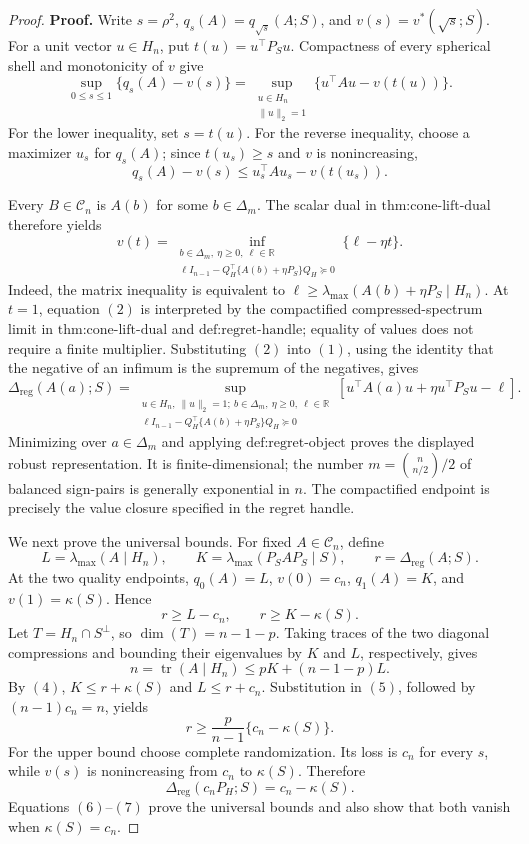 \documentclass{article}
\begin{document}
\begin{proof}
\textbf{Proof.}
Write \(s=\rho^2\), \(q_s(A)=q_{\sqrt{s}}(A;S)\), and \(v(s)=v^*(\sqrt{s};S)\).  For a unit vector \(u\in H_n\), put \(t(u)=u^\top P_Su\).  Compactness of every spherical shell and monotonicity of \(v\) give
\[
\sup_{0\leq s\leq1}\{q_s(A)-v(s)\}
=\sup_{\substack{u\in H_n\\\|u\|_2=1}}
\{u^\top Au-v(t(u))\}.
\tag{1}
\]
For the lower inequality, set \(s=t(u)\).  For the reverse inequality, choose a maximizer \(u_s\) for \(q_s(A)\); since \(t(u_s)\geq s\) and \(v\) is nonincreasing,
\[
q_s(A)-v(s)\leq u_s^\top Au_s-v(t(u_s)).
\]

Every \(B\in\mathcal C_n\) is \(A(b)\) for some \(b\in\Delta_m\).  The scalar dual in \(\text{thm:cone-lift-dual}\) therefore yields
\[
v(t)=
\inf_{\substack{b\in\Delta_m,\ \eta\geq0,\ \ell\in\mathbb R\\
\ell I_{n-1}-Q_H^\top\{A(b)+\eta P_S\}Q_H\succeq0}}
\{\ell-\eta t\}.
\tag{2}
\]
Indeed, the matrix inequality is equivalent to \(\ell\geq\lambda_{\max}(A(b)+\eta P_S\mid H_n)\).  At \(t=1\), equation \((2)\) is interpreted by the compactified compressed-spectrum limit in \(\text{thm:cone-lift-dual}\) and \(\text{def:regret-handle}\); equality of values does not require a finite multiplier.  Substituting \((2)\) into \((1)\), using the identity that the negative of an infimum is the supremum of the negatives, gives
\[
\Delta_{\mathrm{reg}}(A(a);S)
=\sup_{\substack{u\in H_n,\ \|u\|_2=1;\ b\in\Delta_m,\ \eta\geq0,\ \ell\in\mathbb R\\
\ell I_{n-1}-Q_H^\top\{A(b)+\eta P_S\}Q_H\succeq0}}
\left[u^\top A(a)u+\eta u^\top P_Su-\ell\right].
\tag{3}
\]
Minimizing over \(a\in\Delta_m\) and applying \(\text{def:regret-object}\) proves the displayed robust representation.  It is finite-dimensional; the number \(m=\binom{n}{n/2}/2\) of balanced sign-pairs is generally exponential in \(n\).  The compactified endpoint is precisely the value closure specified in the regret handle.

We next prove the universal bounds.  For fixed \(A\in\mathcal C_n\), define
\[
L=\lambda_{\max}(A\mid H_n),
\qquad
K=\lambda_{\max}(P_SAP_S\mid S),
\qquad
r=\Delta_{\mathrm{reg}}(A;S).
\]
At the two quality endpoints, \(q_0(A)=L\), \(v(0)=c_n\), \(q_1(A)=K\), and \(v(1)=\kappa(S)\).  Hence
\[
r\geq L-c_n,
\qquad
r\geq K-\kappa(S).
\tag{4}
\]
Let \(T=H_n\cap S^\perp\), so \(\dim(T)=n-1-p\).  Taking traces of the two diagonal compressions and bounding their eigenvalues by \(K\) and \(L\), respectively, gives
\[
n=\operatorname{tr}(A\mid H_n)
\leq pK+(n-1-p)L.
\tag{5}
\]
By \((4)\), \(K\leq r+\kappa(S)\) and \(L\leq r+c_n\).  Substitution in \((5)\), followed by \((n-1)c_n=n\), yields
\[
r\geq\frac{p}{n-1}\{c_n-\kappa(S)\}.
\tag{6}
\]
For the upper bound choose complete randomization.  Its loss is \(c_n\) for every \(s\), while \(v(s)\) is nonincreasing from \(c_n\) to \(\kappa(S)\).  Therefore
\[
\Delta_{\mathrm{reg}}(c_nP_H;S)=c_n-\kappa(S).
\tag{7}
\]
Equations \((6)\)--\((7)\) prove the universal bounds and also show that both vanish when \(\kappa(S)=c_n\).


\end{proof}
\end{document}

